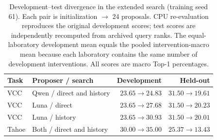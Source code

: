 \begin{table}[t]
\caption{Development--test divergence in the extended search (training seed 61). Each pair is initialization $\rightarrow$ 24 proposals. CPU re-evaluation reproduces the original development scores; test scores are independently recomputed from archived query ranks. The equal-laboratory development mean equals the pooled intervention-macro mean because each laboratory contains the same number of development interventions. All scores are macro Top-1 percentages.}
\label{tab:rebuttal-validation}
\centering\small
\setlength{\tabcolsep}{4pt}
\begin{tabular}{llrr}
\toprule
Task & Proposer / search & Development & Held-out \\
\midrule
VCC & Qwen / direct and history & $23.65\to24.83$ & $31.50\to19.61$ \\
VCC & Luna / direct & $23.65\to27.68$ & $31.50\to20.23$ \\
VCC & Luna / history & $23.65\to30.93$ & $31.50\to20.01$ \\
Tahoe & Both / direct and history & $30.00\to35.00$ & $25.37\to13.43$ \\
\bottomrule
\end{tabular}
\end{table}
